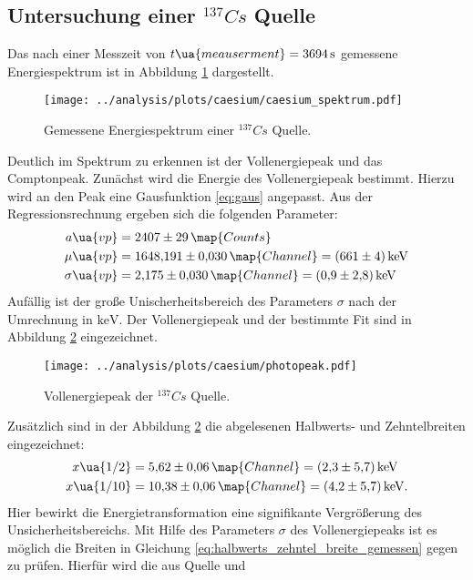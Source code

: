 \subsection{Untersuchung einer $^{137}{Cs}$ Quelle}
\FloatBarrier
Das nach einer Messzeit von $t\ua{meauserment}=\SI{3694}{\second}$ gemessene
Energiespektrum ist in Abbildung \ref{fig:caesium_spektrum} dargestellt.
\begin{figure}
  \centering
  \texttt{[image: ../analysis/plots/caesium/caesium\_spektrum.pdf]}
  \caption{Gemessene Energiespektrum einer $^{137}{Cs}$ Quelle.}
  \label{fig:caesium_spektrum}
\end{figure}
Deutlich im Spektrum zu erkennen ist der Vollenergiepeak und das Comptonpeak.
Zunächst wird die Energie des Vollenergiepeak bestimmt. Hierzu wird an den Peak
eine Gausfunktion \eqref{eq:gaus} angepasst. Aus der Regressionsrechnung ergeben
sich die folgenden Parameter:
\begin{align*}
  a\ua{vp}&=\num{2407\pm29}\,\map{Counts}\\
  \mu\ua{vp}&=\num{1648.191\pm0.030}\,\map{Channel}=\SI{661\pm4}{\kilo\eV} \\ \sigma\ua{vp}&=\num{2.175\pm0.030}\,\map{Channel}=\SI{0.9\pm2.8}{\kilo\eV}
\end{align*}
Aufällig ist der große Unischerheitsbereich des Parameters $\sigma$ nach der Umrechnung in $\si{\kilo\eV}$.
Der Vollenergiepeak und der bestimmte Fit sind in Abbildung \ref{fig:Vollenergiepeak} eingezeichnet.
\begin{figure}
  \centering
  \texttt{[image: ../analysis/plots/caesium/photopeak.pdf]}
  \caption{Vollenergiepeak der $^{137}{Cs}$ Quelle.}
  \label{fig:Vollenergiepeak}
\end{figure}
Zusätzlich sind in der Abbildung \ref{fig:Vollenergiepeak} die abgelesenen
Halbwerts- und Zehntelbreiten eingezeichnet:
\begin{align}
  \label{eq:halbwerts_zehntel_breite_gemessen}
  x\ua{1/2}&=\num{5.62\pm0.06}\,\map{Channel} = \SI{2.3\pm5.7}{\kilo\eV}\\
  x\ua{1/10}&=\num{10.38\pm0.06}\,\map{Channel} = \SI{4.2\pm5.7}{\kilo\eV}.
\end{align}
Hier bewirkt die Energietransformation eine signifikante Vergrößerung des Unsicherheitsbereichs.
Mit Hilfe des Parameters $\sigma$ des Vollenergiepeaks ist es möglich die
Breiten in Gleichung \eqref{eq:halbwerts_zehntel_breite_gemessen} gegen zu prüfen.
Hierfür wird die aus Quelle \cite{halbwertsbreite} und \cite{anleitungV18}

